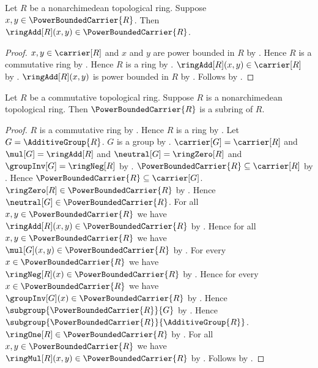 \begin{proposition}\label{power_bounded_carrier_addition}
    Let $R$ be a nonarchimedean topological ring.
    Suppose $x,y\in\PowerBoundedCarrier{R}$.
    Then $\ringAdd[R](x,y)\in\PowerBoundedCarrier{R}$.
\end{proposition}
\begin{proof}
    $x,y\in\carrier[R]$ and $x$ and $y$ are power bounded in $R$ by
        .
    Hence $R$ is a commutative ring by
        .
    Hence $R$ is a ring by .
    $\ringAdd[R](x,y)\in\carrier[R]$ by .
    $\ringAdd[R](x,y)$ is power bounded in $R$ by
        .
    Follows by .
\end{proof}

\begin{theorem}\label{power_bounded_carrier_is_subring}
    Let $R$ be a commutative topological ring.
    Suppose $R$ is a nonarchimedean topological ring.
    Then $\PowerBoundedCarrier{R}$ is a subring of $R$.
\end{theorem}
\begin{proof}
    $R$ is a commutative ring by
        .
    Hence $R$ is a ring by .
    Let $G=\AdditiveGroup{R}$.
    $G$ is a group by .
    $\carrier[G]=\carrier[R]$ and $\mul[G]=\ringAdd[R]$ and
        $\neutral[G]=\ringZero[R]$ and $\groupInv[G]=\ringNeg[R]$ by
        .
    $\PowerBoundedCarrier{R}\subseteq\carrier[R]$ by
        .
    Hence $\PowerBoundedCarrier{R}\subseteq\carrier[G]$.
    $\ringZero[R]\in\PowerBoundedCarrier{R}$ by
        .
    Hence $\neutral[G]\in\PowerBoundedCarrier{R}$.
    For all $x,y\in\PowerBoundedCarrier{R}$ we have
        $\ringAdd[R](x,y)\in\PowerBoundedCarrier{R}$ by
        .
    Hence for all $x,y\in\PowerBoundedCarrier{R}$ we have
        $\mul[G](x,y)\in\PowerBoundedCarrier{R}$ by \auto.
    For every $x\in\PowerBoundedCarrier{R}$ we have
        $\ringNeg[R](x)\in\PowerBoundedCarrier{R}$ by
        .
    Hence for every $x\in\PowerBoundedCarrier{R}$ we have
        $\groupInv[G](x)\in\PowerBoundedCarrier{R}$ by \auto.
    Hence $\subgroup{\PowerBoundedCarrier{R}}{G}$ by .
    Hence $\subgroup{\PowerBoundedCarrier{R}}{\AdditiveGroup{R}}$.
    $\ringOne[R]\in\PowerBoundedCarrier{R}$ by
        .
    For all $x,y\in\PowerBoundedCarrier{R}$ we have
        $\ringMul[R](x,y)\in\PowerBoundedCarrier{R}$ by
        .
    Follows by .
\end{proof}

